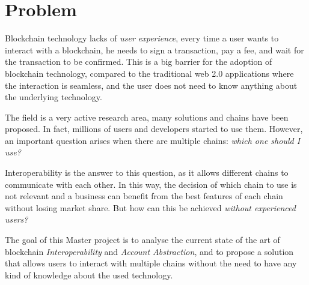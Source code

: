 \chapter{Problem}
\label{chap:problem}

Blockchain technology lacks of \textit{user experience}, every time a user wants to interact with a blockchain, he needs to sign a transaction, pay a fee, and wait for the transaction to be confirmed. This is a big barrier for the adoption of blockchain technology, compared to the traditional web 2.0 applications where the interaction is seamless, and the user does not need to know anything about the underlying technology. 

The field is a very active research area, many solutions and chains have been proposed. In fact, millions of users and developers started to use them. \cite{blockchain-statistics} However, an important question arises when there are multiple chains: \textit{which one should I use?}

Interoperability is the answer to this question, as it allows different chains to communicate with each other. In this way, the decision of which chain to use is not relevant and a business can benefit from the best features of each chain without losing market share. But how can this be achieved \textit{without experienced users?}

The goal of this Master project is to analyse the current state of the art of blockchain \textit{Interoperability} and \textit{Account Abstraction}, and to propose a solution that allows users to interact with multiple chains without the need to have any kind of knowledge about the used technology.